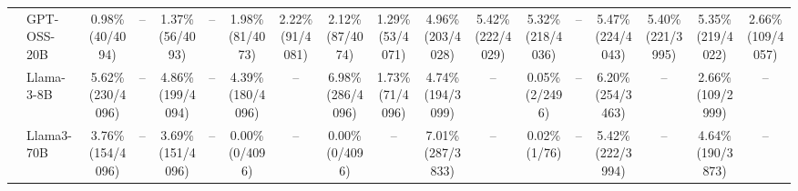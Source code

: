 \begin{table}[t]
{\begin{tabular}{ll*{16}{c}}
 & GPT-OSS-20B & \makecell[c]{0.98\%\\[-1pt]\scriptsize(40/4094)} & -- & \makecell[c]{1.37\%\\[-1pt]\scriptsize(56/4093)} & -- & \makecell[c]{1.98\%\\[-1pt]\scriptsize(81/4073)} & \makecell[c]{2.22\%\\[-1pt]\scriptsize(91/4081)} & \makecell[c]{2.12\%\\[-1pt]\scriptsize(87/4074)} & \makecell[c]{1.29\%\\[-1pt]\scriptsize(53/4071)} & \makecell[c]{4.96\%\\[-1pt]\scriptsize(203/4028)} & \makecell[c]{5.42\%\\[-1pt]\scriptsize(222/4029)} & \makecell[c]{5.32\%\\[-1pt]\scriptsize(218/4036)} & -- & \makecell[c]{5.47\%\\[-1pt]\scriptsize(224/4043)} & \makecell[c]{5.40\%\\[-1pt]\scriptsize(221/3995)} & \makecell[c]{5.35\%\\[-1pt]\scriptsize(219/4022)} & \makecell[c]{2.66\%\\[-1pt]\scriptsize(109/4057)} \\
 & Llama-3-8B & \makecell[c]{5.62\%\\[-1pt]\scriptsize(230/4096)} & -- & \makecell[c]{4.86\%\\[-1pt]\scriptsize(199/4094)} & -- & \makecell[c]{4.39\%\\[-1pt]\scriptsize(180/4096)} & -- & \makecell[c]{6.98\%\\[-1pt]\scriptsize(286/4096)} & \makecell[c]{1.73\%\\[-1pt]\scriptsize(71/4096)} & \makecell[c]{4.74\%\\[-1pt]\scriptsize(194/3099)} & -- & \makecell[c]{0.05\%\\[-1pt]\scriptsize(2/2496)} & -- & \makecell[c]{6.20\%\\[-1pt]\scriptsize(254/3463)} & -- & \makecell[c]{2.66\%\\[-1pt]\scriptsize(109/2999)} & -- \\
 & Llama3-70B & \makecell[c]{3.76\%\\[-1pt]\scriptsize(154/4096)} & -- & \makecell[c]{3.69\%\\[-1pt]\scriptsize(151/4096)} & -- & \makecell[c]{0.00\%\\[-1pt]\scriptsize(0/4096)} & -- & \makecell[c]{0.00\%\\[-1pt]\scriptsize(0/4096)} & -- & \makecell[c]{7.01\%\\[-1pt]\scriptsize(287/3833)} & -- & \makecell[c]{0.02\%\\[-1pt]\scriptsize(1/76)} & -- & \makecell[c]{5.42\%\\[-1pt]\scriptsize(222/3994)} & -- & \makecell[c]{4.64\%\\[-1pt]\scriptsize(190/3873)} & -- \\

\end{tabular}}
\end{table}

